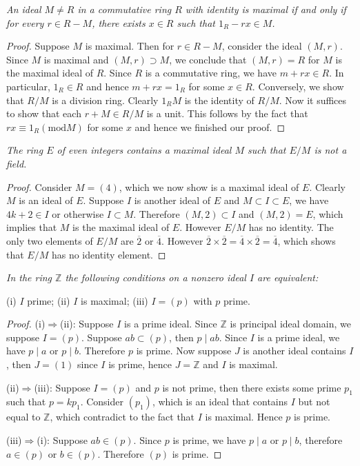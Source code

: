 \begin{problem}\em
An ideal $M\ne R$ in a commutative ring $R$ with identity is maximal if and only if for every $r\in R-M$, there exists $x\in R$ such that $1_R-rx\in M$.
\end{problem}
\begin{proof}
Suppose $M$ is maximal. Then for $r\in R-M$, consider the ideal $(M,r)$. Since $M$ is maximal and $(M,r)\supset M$, we conclude that $(M,r)=R$ for $M$ is the maximal ideal of $R$. Since $R$ is a commutative ring, we have $m+rx\in R$. In particular, $1_R\in R$ and hence $m+rx=1_R$ for some $x\in R$. Conversely, we show that $R/M$ is a division ring. Clearly $1_RM$ is the identity of $R/M$. Now it suffices to show that each $r+M\in R/M$ is a unit. This follows by the fact that $rx\equiv 1_R(\mathrm{mod}M)$ for some $x$ and hence we finished our proof.
\end{proof}
\begin{problem}\em
The ring $E$ of even integers contains a maximal ideal $M$ such that $E/M$ is not a field.
\end{problem}
\begin{proof}
Consider $M=(4)$, which we now show is a maximal ideal of $E$. Clearly $M$ is an ideal of $E$. Suppose $I$ is another ideal of $E$ and $M\subset I\subset E$, we have $4k+2\in I$ or otherwise $I\subset M$. Therefore $(M,2)\subset I$ and $(M,2)=E$, which implies that $M$ is the maximal ideal of $E$. However $E/M$ has no identity. The only two elements of $E/M$ are $\overline{2}$ or $\overline{4}$. However $\overline{2}\times\overline{2}=\overline{4}\times\overline{2}=\overline{4}$, which shows that $E/M$ has no identity element.
\end{proof}
\begin{problem}\em
In the ring $\mathbb{Z}$ the following conditions on a nonzero ideal $I$ are equivalent:\par
(i) $I$ prime; (ii) $I$ is maximal; (iii) $I=(p)$ with $p$ prime.
\end{problem}
\begin{proof}
(i)$\Rightarrow$(ii): Suppose $I$ is a prime ideal. Since $\mathbb{Z}$ is principal ideal domain, we suppose $I=(p)$. Suppose $ab\subset (p)$, then $p\mid ab$. Since $I$ is a prime ideal, we have $p\mid a$ or $p\mid b$. Therefore $p$ is prime. Now suppose $J$ is another ideal contains $I$, then $J=(1)$ since $I$ is prime, hence $J=\mathbb{Z}$ and $I$ is maximal.\par
(ii)$\Rightarrow$(iii): Suppose $I=(p)$ and $p$ is not prime, then there exists some prime $p_1$ such that $p=kp_1$. Consider $(p_1)$, which is an ideal that contains $I$ but not equal to $\mathbb{Z}$, which contradict to the fact that $I$ is maximal. Hence $p$ is prime.\par
(iii)$\Rightarrow$(i): Suppose $ab\in (p)$. Since $p$ is prime, we have $p\mid a$ or $p\mid b$, therefore $a\in (p)$ or $b\in (p)$. Therefore $(p)$ is prime.
\end{proof}
